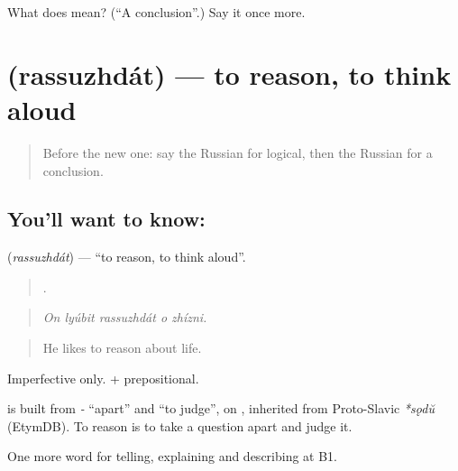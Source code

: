 \begin{tcolorbox}[breakable,colback=teal!4,colframe=teal!35!black,title={Before you move on}]
What does  mean? (\textquotedblleft{}A conclusion\textquotedblright{}.) Say it once more.
\end{tcolorbox}
\section[\texorpdfstring{\ru{рассуждать} (rassuzhdát)}{рассуждать (rassuzhdát)}]{ (rassuzhdát) — to reason, to think aloud}

\label{lesson:RU-C344-rassuzhdat}



\begin{quote}
Before the new one: say the Russian for logical, then the Russian for a conclusion.
\end{quote}

\subsection*{You'll want to know: }
\textbf{} (\emph{rassuzhdát}) — \textquotedblleft{}to reason, to think aloud\textquotedblright{}.

\begin{quote}
    .
\end{quote}

\begin{quote}
\emph{On lyúbit rassuzhdát o zhízni.}
\end{quote}

\begin{quote}
He likes to reason about life.
\end{quote}

Imperfective only. \emph{ } + prepositional.

\begin{cousinweb}
\textbf{} is built from \emph{-} \textquotedblleft{}apart\textquotedblright{} and \emph{} \textquotedblleft{}to judge\textquotedblright{}, on \emph{}, inherited from Proto-Slavic \emph{*sǫdŭ} (EtymDB). To reason is to take a question apart and judge it.
\end{cousinweb}

\begin{grammarlens}[title={What you've built}]
One more word for telling, explaining and describing at B1.
\end{grammarlens}

